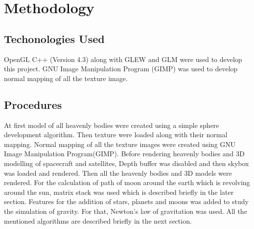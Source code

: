 \documentclass[12pt]{article}
\begin{document}
\clearpage
\section{Methodology}
\subsection{Techonologies Used}
OpenGL C++ (Version 4.3) along with GLEW and GLM were used to develop this project. GNU Image Manipulation Program (GIMP) was used to develop normal mapping of all the texture image.

\subsection{Procedures}
At first model of all heavenly bodies were created using a simple sphere development algorithm. Then texture were  loaded along with their normal mapping. Normal mapping of all the texture images were created using GNU Image Manipulation Program(GIMP). Before rendering heavenly bodies and 3D modelling of spacecraft and satellites, Depth buffer was disabled and then skybox was loaded and rendered. Then all the heavenly bodies and 3D models were rendered. For the calculation of path of moon around the earth which is revolving around the sun, matrix stack was used which is described briefly in the later section. Features for the addition of stars, planets and moons was added to study the simulation of gravity. For that, Newton's law of gravitation was used. All the mentioned algorithms are described briefly in the next section.    
\end{document}
